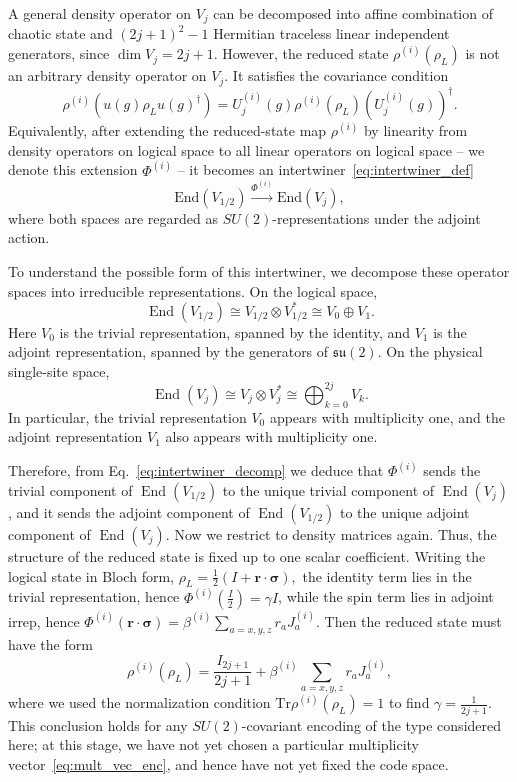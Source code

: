 \documentclass[10pt,twocolumn,superscriptaddress,aps,amsmath,amssymb,citeautoscript,floatfix,prx,longbibliography]{revtex4-2}
\theoremstyle{plain}
\theoremstyle{plain}
\theoremstyle{plain}
\theoremstyle{plain}
\theoremstyle{plain}
\theoremstyle{plain}
\begin{document}
A general density operator on \(V_j\) can be decomposed into affine combination of chaotic state and $(2j+1)^2-1$ Hermitian traceless linear independent generators, since $\dim V_j=2j+1$. However, the reduced state
\(\rho^{(i)}(\rho_L)\) is not an arbitrary density operator on \(V_j\). It satisfies the covariance condition
\begin{equation}\label{eq:reduced-state_cov_cond}
    \rho^{(i)}(u(g)\rho_Lu(g)^\dagger)
    =
    U_j^{(i)}(g)\rho^{(i)}(\rho_L)(U_{j}^{(i)}(g))^\dagger .
\end{equation}
Equivalently, after extending the reduced-state map $\rho^{(i)}$ by linearity from density operators on logical space to all linear operators on logical space -- we denote this extension $\Phi^{(i)}$ -- it becomes an intertwiner~\eqref{eq:intertwiner_def}
\[
    \text{End}(V_{1/2}) \xrightarrow{\Phi^{(i)}} \text{End}(V_j),
\]
where both spaces are regarded as \(SU(2)\)-representations under the adjoint action.

To understand the possible form of this intertwiner, we decompose these operator spaces into irreducible representations. On the logical space,
\[
    \operatorname{End}(V_{1/2})
    \cong
    V_{1/2}\otimes V_{1/2}^*
    \cong
    V_0\oplus V_1.
\]
Here \(V_0\) is the trivial representation, spanned by the identity, and \(V_1\) is the adjoint representation, spanned by the generators of $\mathfrak{su}(2)$. On the physical single-site space,
\[
    \operatorname{End}(V_j)
    \cong
    V_j\otimes V_j^*
    \cong
    \bigoplus_{k=0}^{2j} V_k.
\]
In particular, the trivial representation \(V_0\) appears with multiplicity one, and the adjoint representation \(V_1\) also appears with multiplicity one.

Therefore, from Eq.~\eqref{eq:intertwiner_decomp} we deduce that $\Phi^{(i)}$ sends the trivial component of
\(\operatorname{End}(V_{1/2})\) to the unique trivial component of
\(\operatorname{End}(V_j)\), and it sends the adjoint component of
\(\operatorname{End}(V_{1/2})\) to the unique adjoint component of
\(\operatorname{End}(V_j)\). Now we restrict to density matrices again. Thus, the structure of the reduced state is fixed up to one scalar coefficient.
Writing the logical state in Bloch form,
$
    \rho_L
    =
    \frac12(I+\mathbf r\cdot \boldsymbol\sigma),
$
the identity term lies in the trivial representation, hence $\Phi^{(i)}(\frac{I}{2})= \gamma I$, while the spin term lies in adjoint irrep, hence
\(\Phi^{(i)}(\mathbf r\cdot\boldsymbol\sigma) =\beta^{(i)} \sum_{a=x,y,z} r_a J_a^{(i)}\). Then the reduced state must have the form
\begin{equation}\label{eq:reduced_state_beta}
    \rho^{(i)}(\rho_L)
    =
    \frac{I_{2j+1}}{2j+1}
    +
    \beta^{(i)}
    \sum_{a=x,y,z} r_a J_a^{(i)},
\end{equation}
where we used the normalization condition $\mathrm{Tr}{\rho^{(i)}(\rho_L)=1}$ to find $\gamma=\frac{1}{2j+1}$. This conclusion holds for any \(SU(2)\)-covariant encoding of the type considered here; at this stage, we have not yet chosen a particular multiplicity vector~\eqref{eq:mult_vec_enc}, and hence have not yet fixed the code space. 
\end{document}
